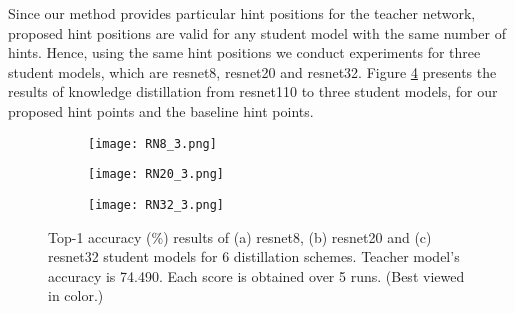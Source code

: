 \documentclass[final,3p,times]{elsarticle}
\begin{document}
Since our method provides particular hint positions for the teacher network, proposed hint positions are valid for any student model with the same number of hints. Hence, using the same hint positions we conduct experiments for three student models, which are resnet8, resnet20 and resnet32. {Figure \ref{fig:RN8-20-32}} presents the results of knowledge distillation from resnet110 to three student models, for our proposed hint points and the baseline hint points. 


\begin{figure}
     \centering
     \begin{subfigure}[b]{0.65\textwidth}
         \centering
         \texttt{[image: RN8\_3.png]}
         \caption{}
         \label{fig:RN8}
     \end{subfigure}
     \hfill
     \begin{subfigure}[b]{0.65\textwidth}
         \centering
         \texttt{[image: RN20\_3.png]}
         \caption{}
         \label{fig:RN20}
     \end{subfigure}
     \hfill
     \begin{subfigure}[b]{0.65\textwidth}
         \centering
         \texttt{[image: RN32\_3.png]}
         \caption{}
         \label{fig:RN32}
     \end{subfigure}
        \caption{{
        Top-1 accuracy (\%) results of (a) resnet8, (b) resnet20 and (c) resnet32 student models for 6 distillation schemes. Teacher model's accuracy is 74.490. Each score is obtained over 5 runs. (Best viewed in color.) %
        \\}}
        \label{fig:RN8-20-32}
\end{figure}
\end{document}

